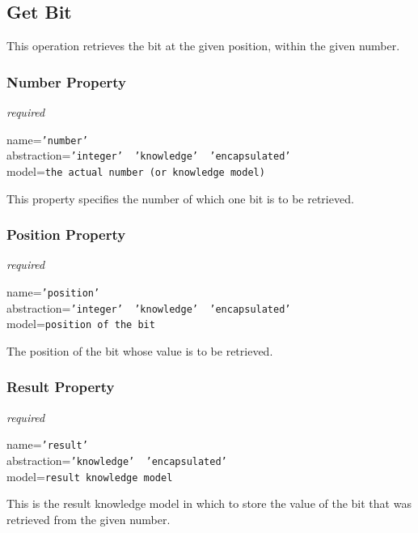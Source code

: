 %
%
%
%
%
%

\subsection{Get Bit}
\label{get_bit_heading}

This operation retrieves the bit at the given position, within the given number.

\subsubsection{Number Property}

\emph{required}

name=\texttt{'number'}\\
abstraction=\texttt{'integer' \vline\ 'knowledge' \vline\ 'encapsulated'}\\
model=\texttt{the actual number (or knowledge model)}

This property specifies the number of which one bit is to be retrieved.

\subsubsection{Position Property}

\emph{required}

name=\texttt{'position'}\\
abstraction=\texttt{'integer' \vline\ 'knowledge' \vline\ 'encapsulated'}\\
model=\texttt{position of the bit}

The position of the bit whose value is to be retrieved.

\subsubsection{Result Property}

\emph{required}

name=\texttt{'result'}\\
abstraction=\texttt{'knowledge' \vline\ 'encapsulated'}\\
model=\texttt{result knowledge model}

This is the result knowledge model in which to store the value of the bit that
was retrieved from the given number.
